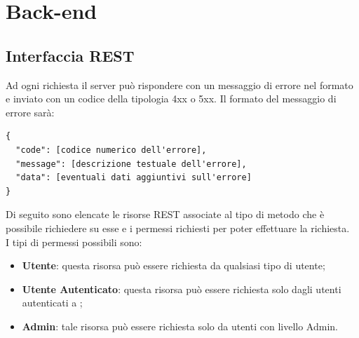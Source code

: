\section{Back-end}


\subsection{Interfaccia REST}

Ad ogni richiesta il server può rispondere con un messaggio di errore nel formato  e inviato con un codice  della tipologia 4xx o 5xx. 
Il formato  del messaggio di errore sarà:
\begin{lstlisting}
{ 
  "code": [codice numerico dell'errore],
  "message": [descrizione testuale dell'errore],
  "data": [eventuali dati aggiuntivi sull'errore]
}
\end{lstlisting}
Di seguito sono elencate le risorse REST associate al tipo di metodo che è possibile richiedere su esse e i permessi richiesti per poter effettuare la richiesta. \\
I tipi di permessi possibili sono: 
\begin{itemize}
\item \textbf{Utente}: questa risorsa può essere richiesta da qualsiasi tipo di utente;
\item \textbf{Utente Autenticato}: questa risorsa può essere richiesta solo dagli utenti autenticati a ;
\item \textbf{Admin}: tale risorsa può essere richiesta solo da utenti con livello Admin.
\end{itemize}


